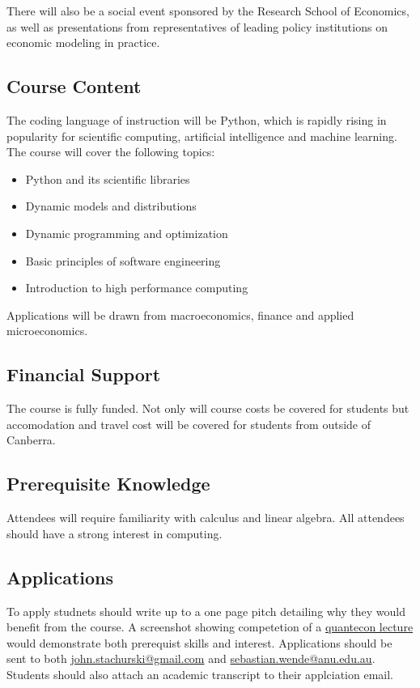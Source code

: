 \documentclass[12pt]{article}
\numberwithin{equation}{section}		%
\numberwithin{table}{section}				%
\begin{document}
There will also be a social event sponsored by the Research School of
Economics, as well as presentations from representatives of leading policy
institutions on economic modeling in practice.


\subsection*{Course Content}

The coding language of instruction will be Python, which is rapidly rising
in popularity for scientific computing, artificial intelligence and machine
learning.  The course will cover the following topics:

\begin{itemize}
    \item Python and its scientific libraries
    \item Dynamic models and distributions
    \item Dynamic programming and optimization
    \item Basic principles of software engineering
    \item Introduction to high performance computing
\end{itemize}

Applications will be drawn from macroeconomics, finance and applied
microeconomics.

\subsection*{Financial Support}

The course is fully funded. Not only will course costs be covered for students but accomodation and travel cost will be covered for students from outside of Canberra.

\subsection*{Prerequisite Knowledge}

Attendees will require familiarity with calculus and linear algebra.
All attendees should have a strong interest in computing.

\subsection*{Applications}

To apply studnets should write up to a one page pitch detailing why they would benefit from the course. A screenshot showing competetion of a \href{https://lectures.quantecon.org/py/}{quantecon lecture} would demonstrate both prerequist skills and interest. 
Applications should be sent to both \href{mailto:john.stachurski@gmail.com}{john.stachurski@gmail.com} and \href{mailto:sebastian.wende@anu.edu.au}{sebastian.wende@anu.edu.au}. Students should also attach an academic transcript to their applciation email.


\end{document}

